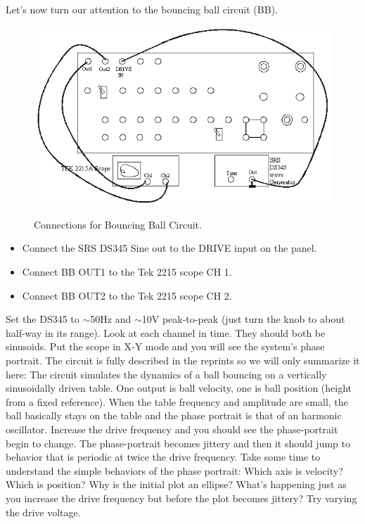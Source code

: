 \documentclass{../lab}
\begin{document}
Let's now turn our attention to the bouncing ball circuit (BB).

\begin{figure}[h]
    \centering
    \href{http://experimentationlab.berkeley.edu/sites/default/files/images/Nldimage130.png}{\includegraphics[width=0.7\linewidth]{images/Nldimage130.png}}
    \caption{Connections for Bouncing Ball Circuit.}
    \label{fig:ConnectionsForBouncingBallCircuit}
\end{figure}

\begin{itemize}
    \item Connect the SRS DS345 Sine out to the DRIVE input on the panel.

    \item Connect BB OUT1 to the Tek 2215 scope CH 1.

    \item Connect BB OUT2 to the Tek 2215 scope CH 2.
\end{itemize}

Set the DS345 to  $\sim$50Hz and  $\sim$10V peak-to-peak (just turn the knob to about half-way in its range). Look at each channel in time. They should both be sinusoids. Put the scope in X-Y mode and you will see the system's phase portrait. The circuit is fully described in the reprints so we will only summarize it here: The circuit simulates the dynamics of a ball bouncing on a vertically sinusoidally driven table. One output is ball velocity, one is ball position (height from a fixed reference). When the table frequency and amplitude are small, the ball basically stays on the table and the phase portrait is that of an harmonic oscillator. Increase the drive frequency and you should see the phase-portrait begin to change. The phase-portrait becomes jittery and then it should jump to behavior that is periodic at twice the drive frequency. Take some time to understand the simple behaviors of the phase portrait: Which axis is velocity? Which is position? Why is the initial plot an ellipse? What's happening just as you increase the drive frequency but before the plot becomes jittery? Try varying the drive voltage.
\end{document}
